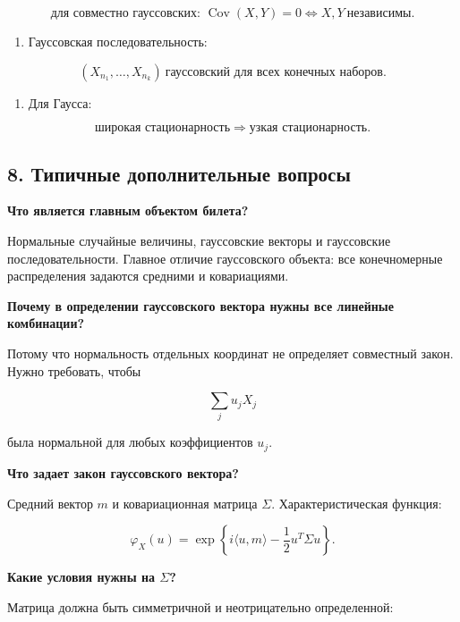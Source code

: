 \documentclass[
  11pt,
  a4paper,
]{article}
\providecommand{\tightlist}{%
  \setlength{\itemsep}{0pt}\setlength{\parskip}{0pt}}
\begin{document}
\[
\text{для совместно гауссовских: }
\operatorname{Cov}(X,Y)=0
\Longleftrightarrow
X,Y\ \text{независимы}.
\]

\begin{enumerate}
\def\labelenumi{\arabic{enumi}.}
\setcounter{enumi}{5}
\tightlist
\item
  Гауссовская последовательность:
\end{enumerate}

\[
(X_{n_1},\ldots,X_{n_k})\ \text{гауссовский для всех конечных наборов}.
\]

\begin{enumerate}
\def\labelenumi{\arabic{enumi}.}
\setcounter{enumi}{6}
\tightlist
\item
  Для Гаусса:
\end{enumerate}

\[
\text{широкая стационарность}
\Longrightarrow
\text{узкая стационарность}.
\]

\subsection{8. Типичные дополнительные
вопросы}\label{ux442ux438ux43fux438ux447ux43dux44bux435-ux434ux43eux43fux43eux43bux43dux438ux442ux435ux43bux44cux43dux44bux435-ux432ux43eux43fux440ux43eux441ux44b}

\textbf{Что является главным объектом билета?}

Нормальные случайные величины, гауссовские векторы и гауссовские
последовательности. Главное отличие гауссовского объекта: все
конечномерные распределения задаются средними и ковариациями.

\textbf{Почему в определении гауссовского вектора нужны все линейные
комбинации?}

Потому что нормальность отдельных координат не определяет совместный
закон. Нужно требовать, чтобы

\[
\sum_j u_jX_j
\]

была нормальной для любых коэффициентов \(u_j\).

\textbf{Что задает закон гауссовского вектора?}

Средний вектор \(m\) и ковариационная матрица \(\Sigma\).
Характеристическая функция:

\[
\varphi_X(u)
=
\exp\left\{i\langle u,m\rangle-\frac12u^T\Sigma u\right\}.
\]

\textbf{Какие условия нужны на \(\Sigma\)?}

Матрица должна быть симметричной и неотрицательно определенной:
\end{document}
